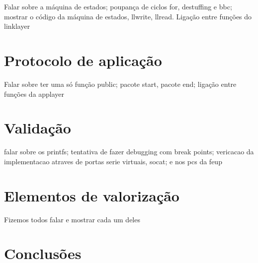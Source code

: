 \documentclass[a4paper]{article}
\begin{document}
Falar sobre a máquina de estados; poupança de ciclos for, destuffing e bbc; mostrar o código da máquina de
estados, llwrite, llread. Ligação entre funções do linklayer

\section{Protocolo de aplicação}
Falar sobre ter uma só função public; pacote start, pacote end; ligação entre
funções da applayer

\section{Validação}
falar sobre os printfs; tentativa de fazer debugging com break points;
vericacao da implementacao atraves de portas serie virtuais, socat; e nos pcs
da feup

\section{Elementos de valorização}
Fizemos todos falar e mostrar cada um deles

\section{Conclusões}
\end{document}
